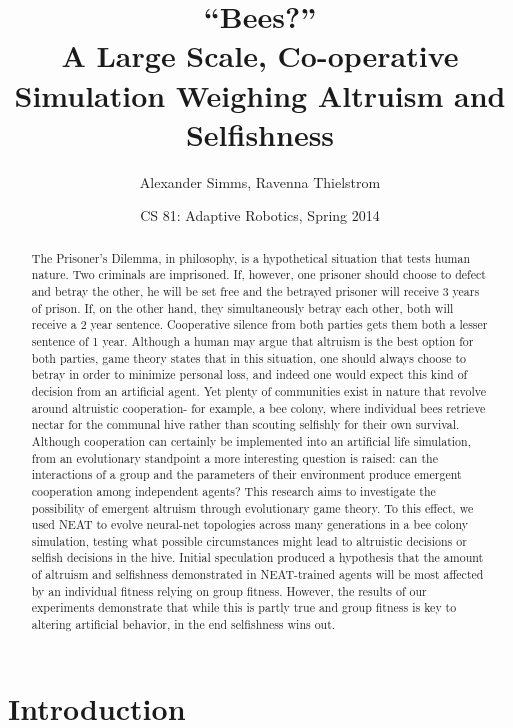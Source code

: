 \documentclass[11pt]{article}
\title  {``Bees?''\\ A Large Scale, Co-operative Simulation 
         Weighing Altruism and Selfishness}
\author {Alexander Simms, Ravenna Thielstrom}
\date   {CS 81: Adaptive Robotics, Spring 2014}
\begin{document}
	\maketitle

	\begin{abstract}

		The Prisoner’s Dilemma, in philosophy, is a hypothetical situation that tests human nature. Two criminals are imprisoned. If, however, one prisoner should choose to defect and betray the other, he will be set free and the betrayed prisoner will receive 3 years of prison. If, on the other hand, they simultaneously betray each other, both will receive a 2 year sentence. Cooperative silence from both parties gets them both a lesser sentence of 1 year. Although a human may argue that altruism is the best option for both parties, game theory states that in this situation, one should always choose to betray in order to minimize personal loss, and indeed one would expect this kind of decision from an artificial agent. Yet plenty of communities exist in nature that revolve around altruistic cooperation- for example, a bee colony, where individual bees retrieve nectar for the communal hive rather than scouting selfishly for their own survival. Although cooperation can certainly be implemented into an artificial life simulation, from an evolutionary standpoint a more interesting question is raised: can the interactions of a group and the parameters of their environment produce emergent cooperation among independent agents? This research aims to investigate the possibility of emergent altruism through evolutionary game theory. To this effect, we used NEAT to evolve neural-net topologies across many generations in a bee colony simulation, testing what possible circumstances might lead to altruistic decisions or selfish decisions in the hive. Initial speculation produced a hypothesis that the amount of altruism and selfishness demonstrated in NEAT-trained agents will be most affected by an individual fitness relying on group fitness. However, the results of our experiments demonstrate that while this is partly true and group fitness is key to altering artificial behavior, in the end selfishness wins out.


	\end{abstract}

	\section{Introduction} %
	\label{sec:introduction}
		
\end{document}
